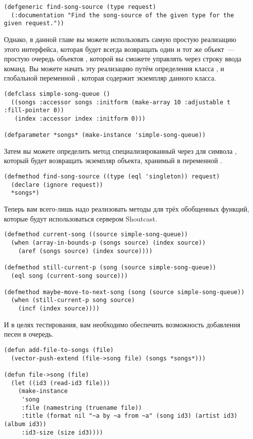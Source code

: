 \begin{lstlisting}
(defgeneric find-song-source (type request)
  (:documentation "Find the song-source of the given type for the given request."))
\end{lstlisting}

Однако, в данной главе вы можете использовать самую простую реализацию этого интерфейса,
которая будет всегда возвращать один и тот же объект~--- простую очередь объектов
, которой вы сможете управлять через строку ввода команд. Вы можете начать эту
реализацию путём определения класса , и глобальной переменной
, которая содержит экземпляр данного класса.

\begin{lstlisting}
(defclass simple-song-queue ()
  ((songs :accessor songs :initform (make-array 10 :adjustable t :fill-pointer 0))
   (index :accessor index :initform 0)))

(defparameter *songs* (make-instance 'simple-song-queue))
\end{lstlisting}

Затем вы можете определить метод  специализированный через
 для символа , который будет возвращать экземпляр объекта,
хранимый в переменной .

\begin{lstlisting}
(defmethod find-song-source ((type (eql 'singleton)) request)
  (declare (ignore request))
  *songs*)
\end{lstlisting}

Теперь вам всего-лишь надо реализовать методы для трёх обобщенных функций, которые будут
использоваться сервером Shoutcast.

\begin{lstlisting}
(defmethod current-song ((source simple-song-queue))
  (when (array-in-bounds-p (songs source) (index source))
    (aref (songs source) (index source))))

(defmethod still-current-p (song (source simple-song-queue))
  (eql song (current-song source)))

(defmethod maybe-move-to-next-song (song (source simple-song-queue))
  (when (still-current-p song source)
    (incf (index source))))
\end{lstlisting}

И в целях тестирования, вам необходимо обеспечить возможность добавления песен в очередь.

\begin{lstlisting}
(defun add-file-to-songs (file)
  (vector-push-extend (file->song file) (songs *songs*)))

(defun file->song (file)
  (let ((id3 (read-id3 file)))
    (make-instance 
     'song
     :file (namestring (truename file))
     :title (format nil "~a by ~a from ~a" (song id3) (artist id3) (album id3))
     :id3-size (size id3))))
\end{lstlisting}

